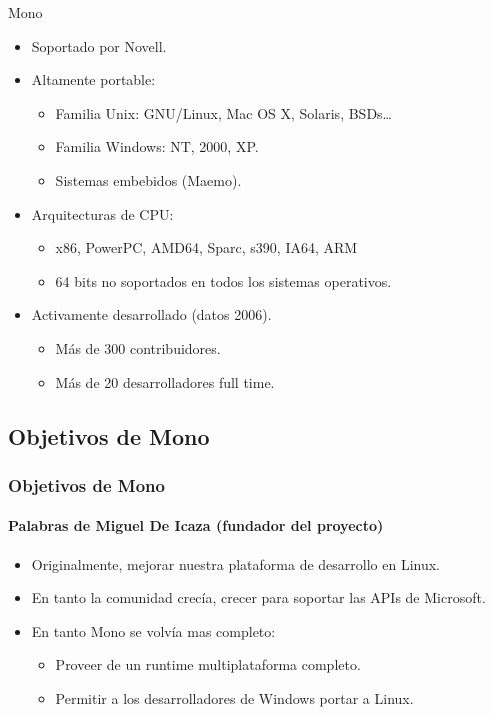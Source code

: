 \documentclass{beamer}
\begin{document}
\begin{frame}{Mono}
  \begin{itemize}
    \item Soportado por Novell.
    \item Altamente portable:
    \begin{itemize}
      \item Familia Unix: GNU/Linux, Mac OS X, Solaris, BSDs\ldots
      \item Familia Windows: NT, 2000, XP.
      \item Sistemas embebidos (Maemo).
    \end{itemize}

    \item Arquitecturas de CPU:
    \begin{itemize}
      \item x86, PowerPC, AMD64, Sparc, s390, IA64, ARM
      \item 64 bits no soportados en todos los sistemas operativos.
    \end{itemize}

    \item Activamente desarrollado (datos 2006).
    \begin{itemize}
      \item Más de 300 contribuidores.
      \item Más de 20 desarrolladores full time.
    \end{itemize}
  \end{itemize}
\end{frame}

\begin{frame}[plain]
  \begin{centering}
  \end{centering}
\end{frame}


\subsection{Objetivos de Mono}

\begin{frame}
  \frametitle{Objetivos de Mono}
  \framesubtitle{Palabras de Miguel De Icaza (fundador del proyecto)}

  \begin{itemize}
    \item Originalmente, mejorar nuestra plataforma de desarrollo en Linux.
    \item En tanto la comunidad crecía, crecer para soportar las APIs de Microsoft.

    \item En tanto Mono se volvía mas completo:
      \begin{itemize}
        \item Proveer de un runtime multiplataforma completo.
        \item Permitir a los desarrolladores de Windows portar a Linux.
      \end{itemize}
  \end{itemize}
\end{frame}
\end{document}
